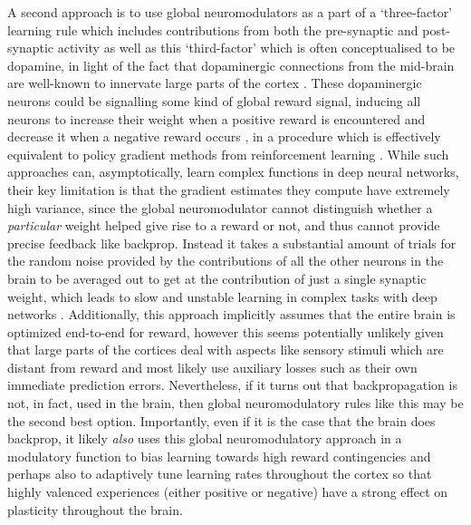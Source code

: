 A second approach is to use global neuromodulators as a part of a `three-factor' learning rule which includes contributions from both the pre-synaptic and post-synaptic activity as well as this `third-factor' \citep{gershman2018uncertainty} which is often conceptualised to be dopamine, in light of the fact that dopaminergic connections from the mid-brain are well-known to innervate large parts of the cortex \citep{daw2006cortical}. These dopaminergic neurons could be signalling some kind of global reward signal, inducing all neurons to increase their weight when a positive reward is encountered and decrease it when a negative reward occurs \citep{seung2003learning,roelfsema2005attention,lillicrap2020backpropagation}, in a procedure which is effectively equivalent to policy gradient methods from reinforcement learning \citep{williams1989experimental}. While such approaches can, asymptotically, learn complex functions in deep neural networks, their key limitation is that the gradient estimates they compute have extremely high variance, since the global neuromodulator cannot distinguish whether a \emph{particular} weight helped give rise to a reward or not, and thus cannot provide precise feedback like backprop. Instead it takes a substantial amount of trials for the random noise provided by the contributions of all the other neurons in the brain to be averaged out to get at the contribution of just a single synaptic weight, which leads to slow and unstable learning in complex tasks with deep networks \citep{lillicrap2019backpropagation}. Additionally, this approach implicitly assumes that the entire brain is optimized end-to-end for reward, however this seems potentially unlikely given that large parts of the cortices deal with aspects like sensory stimuli which are distant from reward and most likely use auxiliary losses such as their own immediate prediction errors.  Nevertheless, if it turns out that backpropagation is not, in fact, used in the brain, then global neuromodulatory rules like this may be the second best option. Importantly, even if it is the case that the brain does backprop, it likely \emph{also} uses this global neuromodulatory approach in a modulatory function to bias learning towards high reward contingencies and perhaps also to adaptively tune learning rates throughout the cortex so that highly valenced experiences (either positive or negative) have a strong effect on plasticity throughout the brain.


